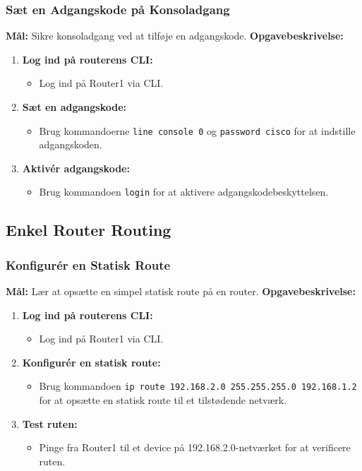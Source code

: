 \subsubsection*{Sæt en Adgangskode på Konsoladgang}
\textbf{Mål:} Sikre konsoladgang ved at tilføje en adgangskode.
\newline\newline\noindent
\textbf{Opgavebeskrivelse:}
\begin{enumerate}
	\item \textbf{Log ind på routerens CLI:}
	\begin{itemize}
		\item Log ind på Router1 via CLI.
	\end{itemize}
	\item \textbf{Sæt en adgangskode:}
	\begin{itemize}
		\item Brug kommandoerne \texttt{line console 0} og \texttt{password cisco} for at indstille adgangskoden.
	\end{itemize}
	\item \textbf{Aktivér adgangskode:}
	\begin{itemize}
		\item Brug kommandoen \texttt{login} for at aktivere adgangskodebeskyttelsen.
	\end{itemize}
\end{enumerate}

\subsection{Enkel Router Routing}
\subsubsection*{Konfigurér en Statisk Route}
\textbf{Mål:} Lær at opsætte en simpel statisk route på en router.
\newline\newline\noindent
\textbf{Opgavebeskrivelse:}
\begin{enumerate}
	\item \textbf{Log ind på routerens CLI:}
	\begin{itemize}
		\item Log ind på Router1 via CLI.
	\end{itemize}
	\item \textbf{Konfigurér en statisk route:}
	\begin{itemize}
		\item Brug kommandoen \texttt{ip route 192.168.2.0 255.255.255.0 192.168.1.2} for at opsætte en statisk route til et tilstødende netværk.
	\end{itemize}
	\item \textbf{Test ruten:}
	\begin{itemize}
		\item Pinge fra Router1 til et device på 192.168.2.0-netværket for at verificere ruten.
	\end{itemize}
\end{enumerate}

